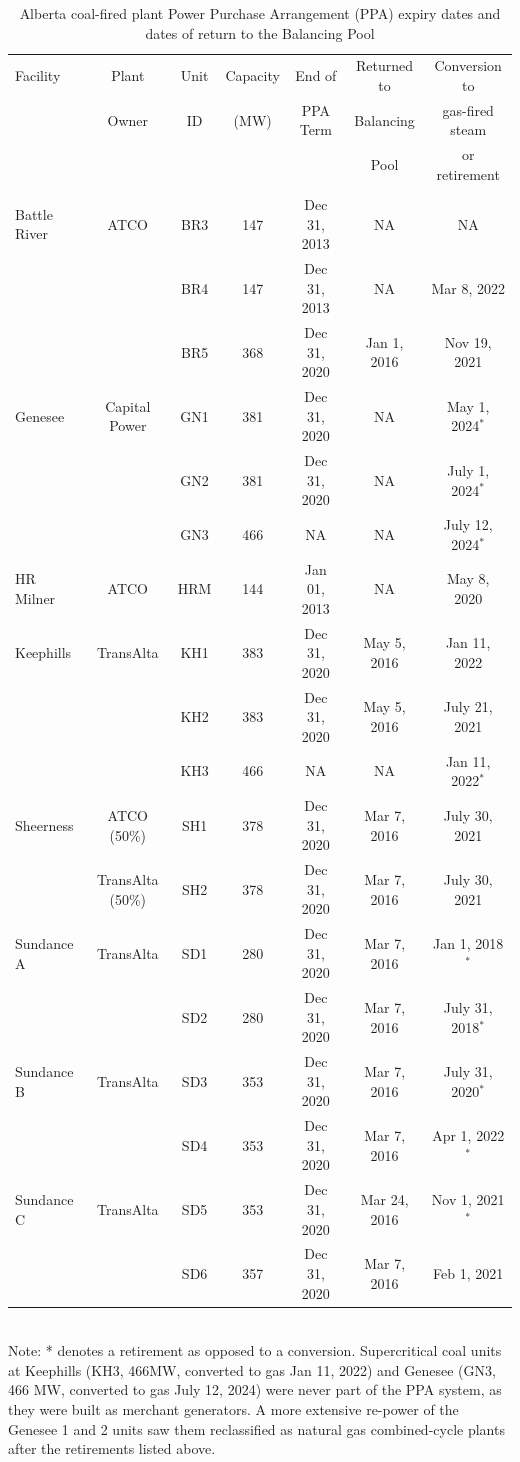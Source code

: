 \documentclass[12pt]{article}
\begin{document}
\renewcommand{\arraystretch}{.85}
\begin{table}[!h]
\vspace{.5cm}
\caption{Alberta coal-fired plant Power Purchase Arrangement (PPA) expiry dates and dates of return to the Balancing Pool}\label{tab:PPA}
\small
\begin{tabular}{lcccccc}
\\[0.5ex]\hline
Facility&Plant&Unit& Capacity& End of& Returned to&Conversion to\\
&Owner&         ID   &  (MW) &  PPA Term &Balancing&gas-fired steam\\
&&                 &    &      & Pool&or retirement\\[+0.5ex]
\hline \\[-1.5ex]
Battle River& ATCO& BR3 &147& Dec 31, 2013&NA&NA\\
&&BR4 &147& Dec 31, 2013&NA&Mar 8, 2022\\
&&BR5 &368& Dec 31, 2020&Jan 1, 2016&Nov 19, 2021\\[+0.75ex]
Genesee &Capital Power &GN1 &381 &Dec 31, 2020&NA&May 1, 2024$^*$\\
&&GN2 &381 &Dec 31, 2020&NA&July 1, 2024$^*$\\
&&GN3 &466 &NA&NA&July 12, 2024$^*$\\[+0.75ex]
HR Milner &ATCO& HRM& 144& Jan 01, 2013&NA&May 8, 2020\\[+0.75ex]
Keephills& TransAlta & KH1 &383& Dec 31, 2020&May 5, 2016&Jan 11, 2022\\
&&KH2& 383& Dec 31, 2020&May 5, 2016&July 21, 2021\\
&&KH3 &466 &NA&NA&Jan 11, 2022$^*$\\[+0.75ex]
Sheerness &ATCO (50\%) & SH1& 378& Dec 31, 2020&Mar 7, 2016&July 30, 2021\\
&TransAlta (50\%)&SH2& 378& Dec 31, 2020&Mar 7, 2016&July 30, 2021\\[+0.75ex]
Sundance A &TransAlta&  SD1 &280& Dec 31, 2020&Mar 7, 2016&Jan 1, 2018$^*$\\
&&SD2 &280& Dec 31, 2020&Mar 7, 2016&July 31, 2018$^*$\\[+0.75ex]
Sundance B &TransAlta & SD3& 353& Dec 31, 2020&Mar 7, 2016&July 31, 2020$^*$\\
&&SD4 &353 &Dec 31, 2020&Mar 7, 2016&Apr 1, 2022$^*$\\[+0.75ex]
Sundance C &TransAlta& SD5& 353& Dec 31, 2020&Mar 24, 2016&Nov 1, 2021$^*$\\
&&SD6& 357& Dec 31, 2020&Mar 7, 2016&Feb 1, 2021\\[+0.75ex]
  \hline
\end{tabular}\\
Note: * denotes a retirement as opposed to a conversion. Supercritical coal units at Keephills (KH3, 466MW, converted to gas Jan 11, 2022) and Genesee (GN3, 466 MW, converted to gas July 12, 2024) were never part of the PPA system, as they were built as merchant generators. A more extensive re-power of the Genesee 1 and 2 units saw them reclassified as natural gas combined-cycle plants after the retirements listed above. 
\end{table}
\end{document}
